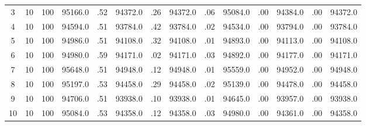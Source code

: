 \documentclass[12pt,a4paper]{article}
\begin{document}
\begin{center}
{\begin{tabular}{|ccc|cc|cc|cc|cc|cc|c|}
3             &  10& 100&  95166.0&  .52&  94372.0&  .26&  94372.0&  .06&  95084.0&  .00&  94384.0&  .00&  94372.0\\[-0.01in]
4             &  10& 100&  94594.0&  .51&  93784.0&  .42&  93784.0&  .02&  94534.0&  .00&  93794.0&  .00&  93784.0\\[-0.01in]
5             &  10& 100&  94986.0&  .51&  94108.0&  .32&  94108.0&  .01&  94893.0&  .00&  94113.0&  .00&  94108.0\\[-0.01in]
6             &  10& 100&  94980.0&  .59&  94171.0&  .02&  94171.0&  .03&  94892.0&  .00&  94177.0&  .00&  94171.0\\[-0.01in]
7             &  10& 100&  95648.0&  .51&  94948.0&  .12&  94948.0&  .01&  95559.0&  .00&  94952.0&  .00&  94948.0\\[-0.01in]
8             &  10& 100&  95197.0&  .53&  94458.0&  .29&  94458.0&  .02&  95139.0&  .00&  94478.0&  .00&  94458.0\\[-0.01in]
9             &  10& 100&  94706.0&  .51&  93938.0&  .10&  93938.0&  .01&  94645.0&  .00&  93957.0&  .00&  93938.0\\[-0.01in]
10            &  10& 100&  95084.0&  .53&  94358.0&  .12&  94358.0&  .03&  94980.0&  .00&  94361.0&  .00&  94358.0\\[-0.01in]
\hline
\end{tabular}
 }
\end{center}
\newpage
\end{document}
